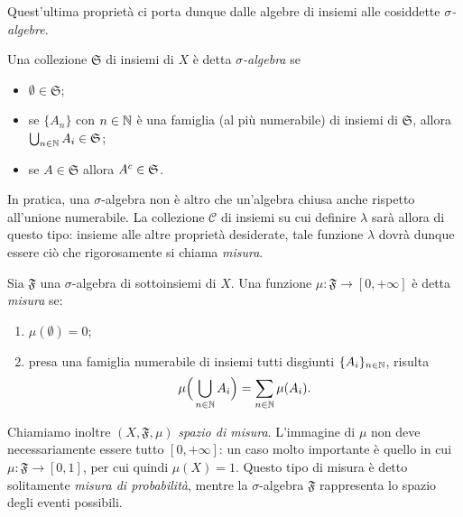 Quest'ultima proprietà ci porta dunque dalle algebre di insiemi alle cosiddette \emph{$\sigma$-algebre}.
\begin{definizione} \label{d:sigma-algebra}
	Una collezione $\mathfrak S$ di insiemi di $X$ è detta \emph{$\sigma$-algebra} se
	\begin{itemize}
		\item $\emptyset\in\mathfrak S$;
		\item se $\{A_n\}$ con $n\in\mathbb{N}$ è una famiglia (al più numerabile) di insiemi di $\mathfrak S$, allora $\bigcup_{n\in\mathbb{N}}A_i\in\mathfrak S$;
		\item se $A\in\mathfrak S$ allora ${A}^c\in\mathfrak S$.
	\end{itemize}
\end{definizione}
In pratica, una $\sigma$-algebra non è altro che un'algebra chiusa anche rispetto all'unione numerabile.
La collezione $\mathcal C$ di insiemi su cui definire $\lambda$ sarà allora di questo tipo: insieme alle altre proprietà desiderate, tale funzione $\lambda$ dovrà dunque essere ciò che rigorosamente si chiama \emph{misura}.
\begin{definizione} \label{d:misura}
	Sia $\mathfrak F$ una $\sigma$-algebra di sottoinsiemi di $X$.
	Una funzione $\mu\colon\mathfrak F\to[0,+\infty]$ è detta \emph{misura} se:
	\begin{enumerate}
		\item $\mu(\emptyset)=0$;
		\item presa una famiglia numerabile di insiemi tutti disgiunti $\{A_i\}_{n\in\mathbb{N}}$, risulta
			\begin{equation}
				\mu\Big(\bigcup_{n\in\mathbb{N}}A_i\Big)=\sum_{n\in\mathbb{N}}\mu(A_i).
				\label{eq:sigma-addivita}
			\end{equation}
	\end{enumerate}
\end{definizione}
Chiamiamo inoltre $(X,\mathfrak F,\mu)$ \emph{spazio di misura}.
L'immagine di $\mu$ non deve necessariamente essere tutto $[0,+\infty]$: un caso molto importante è quello in cui $\mu\colon\mathfrak F\to[0,1]$, per cui quindi $\mu(X)=1$.
Questo tipo di misura è detto solitamente \emph{misura di probabilità}, mentre la $\sigma$-algebra $\mathfrak F$ rappresenta lo spazio degli eventi possibili.

